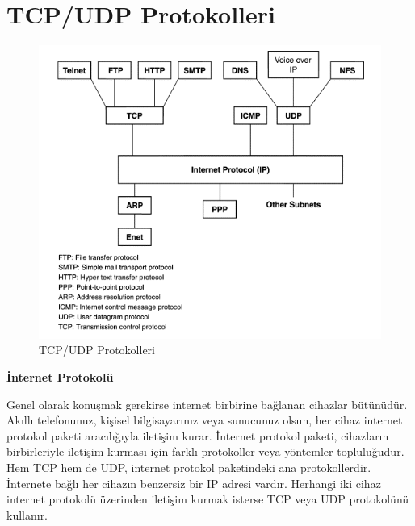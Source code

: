 
\vspace{20mm}
\section{TCP/UDP Protokolleri}
\begin{figure}[!htb]
    \centering
    \includegraphics[width=1\linewidth]{00-images/11-network.png}
    \caption{TCP/UDP Protokolleri}
    \label{fig:my_label}
\end{figure}

\vspace{10mm}
\textbf{İnternet Protokolü}
\vspace{5mm}

Genel olarak konuşmak gerekirse internet birbirine bağlanan cihazlar bütünüdür. Akıllı telefonunuz, kişisel bilgisayarınız veya sunucunuz olsun, her cihaz internet protokol paketi aracılığıyla iletişim kurar. İnternet protokol paketi, cihazların birbirleriyle iletişim kurması için farklı protokoller veya yöntemler topluluğudur. Hem TCP hem de UDP, internet protokol paketindeki ana protokollerdir. İnternete bağlı her cihazın benzersiz bir IP adresi vardır. Herhangi iki cihaz internet protokolü üzerinden iletişim kurmak isterse TCP veya UDP protokolünü kullanır.

